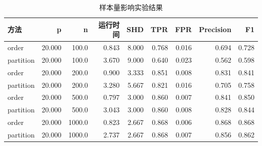\begin{table}[H]
\centering
\small
\setlength{\tabcolsep}{2pt}
\caption{样本量影响实验结果}
\label{tab:sample}
\begin{tabular}{lrrrrrrrr}
\toprule
方法 & p & n & 运行时间 & SHD & TPR & FPR & Precision & F1
\\
\midrule
order & 20.000 & 100.0 & 0.843 & 8.000 & 0.768 & 0.016 & 0.694 & 0.728 \\
partition & 20.000 & 100.0 & 3.670 & 9.000 & 0.640 & 0.023 & 0.562 & 0.598 \\
order & 20.000 & 200.0 & 0.900 & 3.333 & 0.851 & 0.008 & 0.831 & 0.841 \\
partition & 20.000 & 200.0 & 3.280 & 5.667 & 0.821 & 0.016 & 0.705 & 0.758 \\
order & 20.000 & 500.0 & 0.797 & 3.000 & 0.860 & 0.007 & 0.841 & 0.850 \\
partition & 20.000 & 500.0 & 3.043 & 3.000 & 0.860 & 0.008 & 0.828 & 0.844 \\
order & 20.000 & 1000.0 & 0.823 & 2.667 & 0.868 & 0.006 & 0.868 & 0.868 \\
partition & 20.000 & 1000.0 & 2.737 & 2.667 & 0.868 & 0.007 & 0.856 & 0.862 \\
\bottomrule
\end{tabular}
\end{table}
